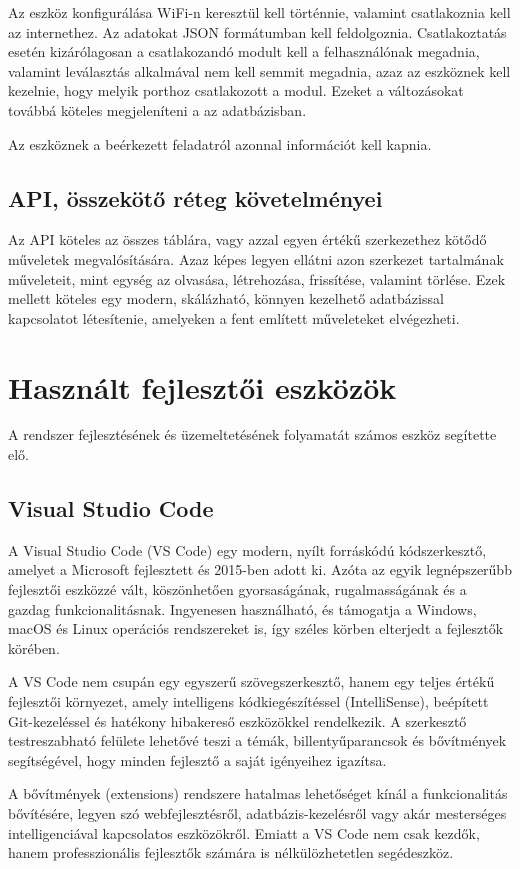 \documentclass{thesis-ekf}
\theoremstyle{definition}
\theoremstyle{remark}
\begin{document}
	Az eszköz konfigurálása WiFi-n keresztül kell történnie, valamint csatlakoznia kell az internethez. Az adatokat JSON formátumban kell feldolgoznia. Csatlakoztatás esetén kizárólagosan a csatlakozandó modult kell a felhasználónak megadnia, valamint leválasztás alkalmával nem kell semmit megadnia, azaz az eszköznek kell kezelnie, hogy melyik porthoz csatlakozott a modul. Ezeket a változásokat továbbá köteles megjeleníteni a az adatbázisban.
	
	Az eszköznek a beérkezett feladatról azonnal információt kell kapnia.
	\subsection{API, összekötő réteg követelményei}
	Az API köteles az összes táblára, vagy azzal egyen értékű szerkezethez kötődő műveletek megvalósítására. Azaz képes legyen ellátni azon szerkezet tartalmának műveleteit, mint egység az olvasása, létrehozása, frissítése, valamint törlése. Ezek mellett köteles egy modern, skálázható, könnyen kezelhető adatbázissal kapcsolatot létesítenie, amelyeken a fent említett műveleteket elvégezheti.
	\section{Használt fejlesztői eszközök}
	A rendszer fejlesztésének és üzemeltetésének folyamatát számos eszköz segítette elő.
	\subsection{Visual Studio Code}
	A Visual Studio Code (VS Code) egy modern, nyílt forráskódú kódszerkesztő, amelyet a Microsoft fejlesztett és 2015-ben adott ki. Azóta az egyik legnépszerűbb fejlesztői eszközzé vált, köszönhetően gyorsaságának, rugalmasságának és a gazdag funkcionalitásnak. Ingyenesen használható, és támogatja a Windows, macOS és Linux operációs rendszereket is, így széles körben elterjedt a fejlesztők körében.
	
	A VS Code nem csupán egy egyszerű szövegszerkesztő, hanem egy teljes értékű fejlesztői környezet, amely intelligens kódkiegészítéssel (IntelliSense), beépített Git-kezeléssel és hatékony hibakereső eszközökkel rendelkezik. A szerkesztő testreszabható felülete lehetővé teszi a témák, billentyűparancsok és bővítmények segítségével, hogy minden fejlesztő a saját igényeihez igazítsa.
	
	A bővítmények (extensions) rendszere hatalmas lehetőséget kínál a funkcionalitás bővítésére, legyen szó webfejlesztésről, adatbázis-kezelésről vagy akár mesterséges intelligenciával kapcsolatos eszközökről. Emiatt a VS Code nem csak kezdők, hanem professzionális fejlesztők számára is nélkülözhetetlen segédeszköz.
	
\end{document}
